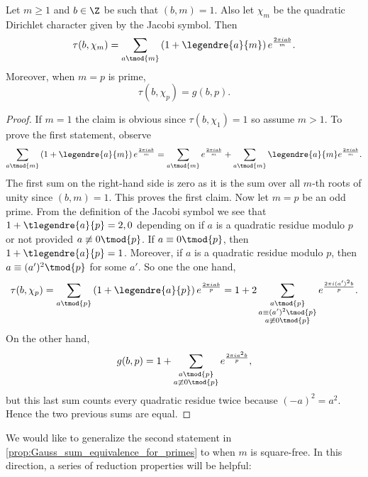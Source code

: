       \begin{proposition}\label{prop:Gauss_sum_equivalence_for_primes}
        Let $m \ge 1$ and $b \in \Z$ be such that $(b,m) = 1$. Also let $\chi_{m}$ be the quadratic Dirichlet character given by the Jacobi symbol. Then
        \[
          \tau(b,\chi_{m}) = \sum_{a \tmod{m}}\left(1+\legendre{a}{m}\right)e^{\frac{2\pi iab}{m}}.
        \]
        Moreover, when $m = p$ is prime,
        \[
          \tau(b,\chi_{p}) = g(b,p).
        \]
      \end{proposition}
      \begin{proof}
        If $m = 1$ the claim is obvious since $\tau(b,\chi_{1}) = 1$ so assume $m > 1$. To prove the first statement, observe
        \[
          \sum_{a \tmod{m}}\left(1+\legendre{a}{m}\right)e^{\frac{2\pi iab}{m}} = \sum_{a \tmod{m}}e^{\frac{2\pi iab}{m}}+\sum_{a \tmod{m}}\legendre{a}{m}e^{\frac{2\pi iab}{m}}.
        \]
        The first sum on the right-hand side is zero as it is the sum over all $m$-th roots of unity since $(b,m) = 1$. This proves the first claim. Now let $m = p$ be an odd prime. From the definition of the Jacobi symbol we see that $1+\tlegendre{a}{p} = 2,0$ depending on if $a$ is a quadratic residue modulo $p$ or not provided $a \not\equiv 0 \tmod{p}$. If $a \equiv 0 \tmod{p}$, then $1+\tlegendre{a}{p} = 1$. Moreover, if $a$ is a quadratic residue modulo $p$, then $a \equiv (a')^{2} \tmod{p}$ for some $a'$. So one the one hand,
        \[
          \tau(b,\chi_{p}) = \sum_{a \tmod{p}}\left(1+\legendre{a}{p}\right)e^{\frac{2\pi iab}{p}} = 1+2\sum_{\substack{a \tmod{p} \\ a \equiv (a')^{2} \tmod{p} \\ a \not\equiv 0 \tmod{p}}}e^{\frac{2\pi i(a')^{2}b}{p}}.
        \]
        On the other hand,
        \[
          g(b,p) = 1+\sum_{\substack{a \tmod{p} \\ a \not\equiv 0 \tmod{p}}}e^{\frac{2\pi ia^{2}b}{p}},
        \]
        but this last sum counts every quadratic residue twice because $(-a)^{2} = a^{2}$. Hence the two previous sums are equal.
      \end{proof}

      We would like to generalize the second statement in \cref{prop:Gauss_sum_equivalence_for_primes} to when $m$ is square-free. In this direction, a series of reduction properties will be helpful:

